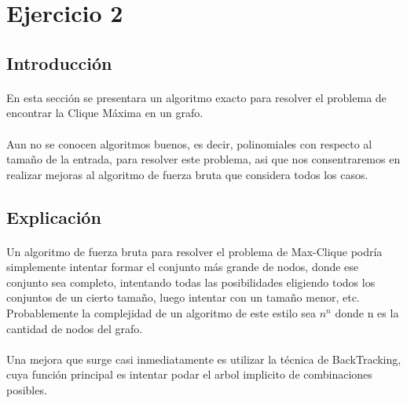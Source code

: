 \section{Ejercicio 2}

\subsection{Introducción}

\paragraph{}
En esta sección se presentara un algoritmo exacto para resolver el problema de encontrar la Clique Máxima en un grafo.


\paragraph{}
Aun no se conocen algoritmos buenos, es decir, polinomiales con respecto al tamaño de la entrada, para resolver 
este problema, asi que nos consentraremos en realizar mejoras al algoritmo de fuerza bruta que considera todos los casos.


\subsection{Explicación}

\paragraph{}
Un algoritmo de fuerza bruta para resolver el problema de Max-Clique podría simplemente intentar formar el conjunto más 
grande de nodos, donde ese conjunto sea completo, intentando todas las posibilidades eligiendo todos los conjuntos de un cierto tamaño,
luego intentar con un tamaño menor, etc. Probablemente la complejidad de un algoritmo de este estilo sea $n^n$ donde n es la cantidad 
de nodos del grafo.

\paragraph{}
Una mejora que surge casi inmediatamente es utilizar la técnica de BackTracking, cuya función principal es intentar podar el 
arbol implicito de combinaciones posibles. 

